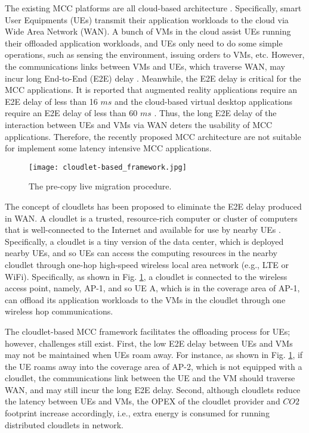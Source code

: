 \documentclass[journal,12pt,draftclsnofoot,onecolumn]{IEEEtran}
\begin{document}
The existing MCC platforms are all cloud-based architecture \cite{1.1}. Specifically, smart User Equipments (UEs) transmit their application workloads to the cloud via Wide Area Network (WAN). A bunch of VMs in the cloud assist UEs running their offloaded application workloads, and UEs only need to do some simple operations, such as sensing the environment, issuing orders to VMs, etc. However, the communications links between VMs and UEs, which traverse WAN, may incur long End-to-End (E2E) delay \cite{2}. Meanwhile, the E2E delay is critical for the MCC applications. It is reported that augmented reality applications require an E2E delay of less than 16 $ms$ \cite{2.1} and the cloud-based virtual desktop applications require an E2E delay of less than 60 $ms$ \cite{2.2}. Thus, the long E2E delay of the interaction between UEs and VMs via WAN deters the usability of MCC applications. Therefore, the recently proposed MCC architecture are not suitable for implement some latency intensive MCC applications.

\begin{figure}[!htb]
	\centering	
	\texttt{[image: cloudlet-based\_framework.jpg]}
	\caption{The pre-copy live migration procedure.}	
	\label{fig: cloudlet-based_framework}
\end{figure}

The concept of cloudlets has been proposed to eliminate the E2E delay produced in WAN. A cloudlet is a trusted, resource-rich computer or cluster of computers that is well-connected to the Internet and available for use by nearby UEs \cite{2}. Specifically, a cloudlet is a tiny version of the data center, which is deployed nearby UEs, and so UEs can access the computing resources in the nearby cloudlet through one-hop high-speed wireless local area network (e.g., LTE or WiFi). Specifically, as shown in Fig. \ref{fig: cloudlet-based_framework}, a cloudlet is connected to the wireless access point, namely, AP-1, and so UE A, which is in the coverage area of AP-1, can offload its application workloads to the VMs in the cloudlet through one wireless hop communications.



The cloudlet-based MCC framework facilitates the offloading process for UEs; however, challenges still exist. First, the low E2E delay between UEs and VMs may not be maintained when UEs roam away. For instance, as shown in Fig. \ref{fig: cloudlet-based_framework}, if the UE roams away into the coverage area of AP-2, which is not equipped with a cloudlet, the communications link between the UE and the VM should traverse WAN, and may still incur the long E2E delay. Second, although cloudlets reduce the latency between UEs and VMs, the OPEX of the cloudlet provider and $CO2$ footprint increase accordingly, i.e., extra energy is consumed for running distributed cloudlets in network.
\end{document}
